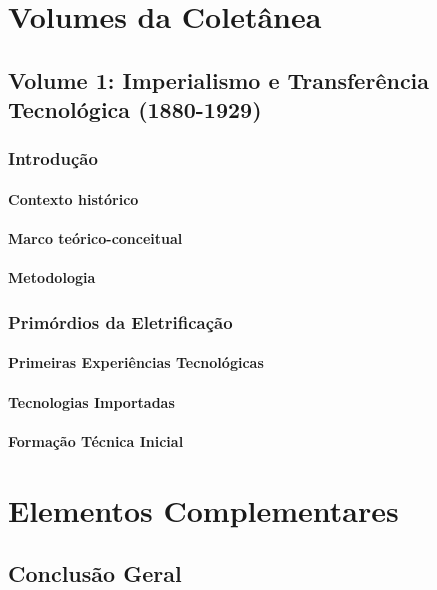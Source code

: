 \documentclass[12pt,a4paper]{report}
\begin{document}

\part{Volumes da Coletânea}

\chapter{Volume 1: Imperialismo e Transferência Tecnológica (1880-1929)}
\section{Introdução}
\subsection{Contexto histórico}
\subsection{Marco teórico-conceitual}
\subsection{Metodologia}

\section{Primórdios da Eletrificação}
\subsection{Primeiras Experiências Tecnológicas}
\subsection{Tecnologias Importadas}
\subsection{Formação Técnica Inicial}


\part{Elementos Complementares}

\chapter{Conclusão Geral}
\end{document}
